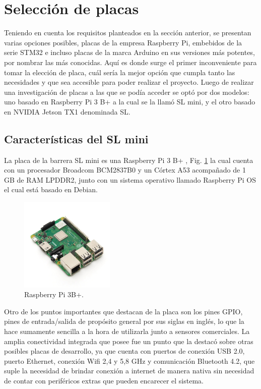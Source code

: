 \section{Selección de placas}

Teniendo en cuenta los requisitos planteados en la sección anterior, se presentan varias opciones posibles,
placas de la empresa Raspberry Pi, embebidos de la serie STM32 e incluso placas de la marca Arduino en sus versiones más potentes, por nombrar las más conocidas.
Aquí es donde surge el primer inconveniente para tomar la elección de placa,
cuál sería la mejor opción que cumpla tanto las necesidades y que sea accesible para poder realizar el proyecto.
Luego de realizar una investigación de placas a las que se podía acceder se optó por dos modelos: uno basado en Raspberry Pi 3 B+ a la cual se la llamó SL mini, y el otro basado en NVIDIA Jetson TX1 denominada SL.

\subsection{Características del SL mini}

La placa de la barrera SL mini es una Raspberry Pi 3 B+ \cite{noauthor_documentacion_nodate-2}, Fig. \ref{fig:raspberry} la cual cuenta con un procesador
Broadcom BCM2837B0 y un Córtex A53 acompañado de 1 GB de RAM LPDDR2, junto con un sistema operativo llamado Raspberry Pi OS el cual está basado en Debian.

\begin{figure}[bth]
    \centering
    \includegraphics[width=0.4\textwidth]{imgs/Raspberry-pi3b+.jpg}
    \caption{Raspberry Pi 3B+.}
    \label{fig:raspberry}
\end{figure}

Otro de los puntos importantes que destacan de la placa son los pines GPIO, pines de entrada/salida de propósito general por sus siglas en inglés, lo que la hace sumamente sencilla a la hora de utilizarla junto a sensores comerciales.
La amplia conectividad integrada que posee fue un punto que la destacó sobre otras posibles placas de desarrollo, ya que cuenta con puertos de conexión USB 2.0, puerto Ethernet, conexión Wifi 2,4 y 5,8 GHz y comunicación Bluetooth 4.2, que suple la necesidad de brindar conexión a internet de manera nativa sin necesidad de contar con periféricos extras que pueden encarecer el sistema.

